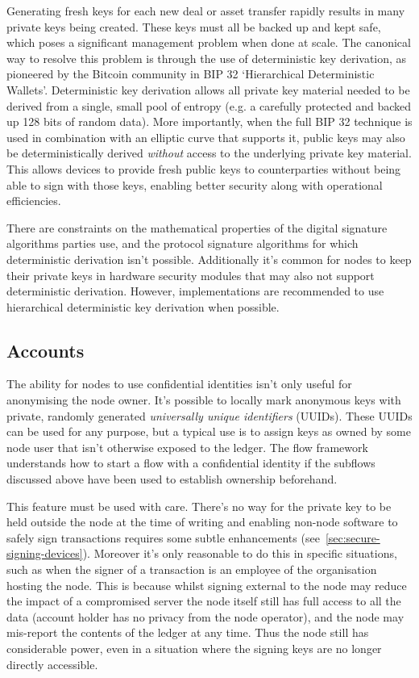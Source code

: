 \documentclass{article}
\begin{document}
Generating fresh keys for each new deal or asset transfer rapidly results in many private keys being created. These
keys must all be backed up and kept safe, which poses a significant management problem when done at scale. The
canonical way to resolve this problem is through the use of deterministic key derivation, as pioneered by the
Bitcoin community in BIP 32 `Hierarchical Deterministic Wallets'\cite{BIP32}. Deterministic key derivation allows
all private key material needed to be derived from a single, small pool of entropy (e.g. a carefully protected and
backed up 128 bits of random data). More importantly, when the full BIP 32 technique is used in combination with an
elliptic curve that supports it, public keys may also be deterministically derived \emph{without} access to the
underlying private key material. This allows devices to provide fresh public keys to counterparties without being
able to sign with those keys, enabling better security along with operational efficiencies.

There are constraints on the mathematical properties of the digital signature algorithms parties use, and the
protocol signature algorithms for which deterministic derivation isn't possible. Additionally it's common for nodes
to keep their private keys in hardware security modules that may also not support deterministic derivation.
However, implementations are recommended to use hierarchical deterministic key derivation when possible.


\subsection{Accounts}\label{subsec:accounts}

The ability for nodes to use confidential identities isn't only useful for anonymising the node owner. It's
possible to locally mark anonymous keys with private, randomly generated \emph{universally unique identifiers}
(UUIDs). These UUIDs can be used for any purpose, but a typical use is to assign keys as owned by some node user
that isn't otherwise exposed to the ledger. The flow framework understands how to start a flow with a
confidential identity if the subflows discussed above have been used to establish ownership beforehand.

This feature must be used with care. There's no way for the private key to be held outside the node at the time
of writing and enabling non-node software to safely sign transactions requires some subtle enhancements
(see~\cref{sec:secure-signing-devices}). Moreover it's only reasonable to do this in specific situations, such
as when the signer of a transaction is an employee of the organisation hosting the node. This is because whilst
signing external to the node may reduce the impact of a compromised server the node itself still has full access
to all the data (account holder has no privacy from the node operator), and the node may mis-report
the contents of the ledger at any time. Thus the node still has considerable power, even in a situation where
the signing keys are no longer directly accessible.
\end{document}
